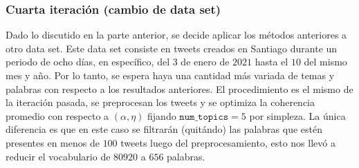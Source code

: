 \documentclass{article}
\begin{document}
	
\subsubsection{Cuarta iteración (cambio de data set)}
	Dado lo discutido en la parte anterior, se decide aplicar los métodos anteriores a otro data set. Este data set consiste en tweets creados en Santiago durante un periodo de ocho días, en específico, del $3$ de enero de $2021$ hasta el $10$ del mismo mes y año. Por lo tanto, se espera haya una cantidad más variada de temas y palabras con respecto a los resultados anteriores. El procedimiento es el mismo de la iteración pasada, se preprocesan los tweets y se optimiza la coherencia promedio con respecto a $(\alpha, \eta)$ fijando $\texttt{num\_topics}=5$ por simpleza. La única diferencia es que en este caso se filtrarán (quitándo) las palabras que estén presentes en menos de $100$ tweets luego del preprocesamiento, esto nos llevó a reducir el vocabulario de $80920$ a $656$ palabras.  
	
\end{document}
